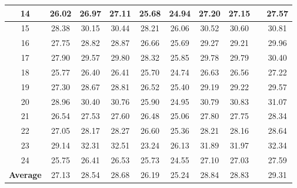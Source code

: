 \documentclass[10pt,twocolumn,letterpaper]{article}
\begin{document}
\begin{table}
\begin{center}
\begin{tabular}{|c||c|c|c|c|c|c|c|c|c|}
14 & 26.02 & 26.97 & 27.11 & 25.68 & 24.94 & 27.20 & 27.15 &  & 27.57
\\
\hline
15 & 28.38 & 30.15 & 30.44 & 28.21 & 26.06 & 30.52 & 30.60 &  & 30.81
\\
\hline
16 & 27.75 & 28.82 & 28.87 & 26.66 & 25.69 & 29.27 & 29.21 &  & 29.96
\\
\hline
17 & 27.90 & 29.57 & 29.80 & 28.32 & 25.85 & 29.78 & 29.79 &  & 30.40
\\
\hline
18 & 25.77 & 26.40 & 26.41 & 25.70 & 24.74 & 26.63 & 26.56 &  & 27.22
\\
\hline
19 & 27.30 & 28.67 & 28.81 & 26.52 & 25.40 & 29.19 & 29.22 &  & 29.57 
\\
\hline
20 & 28.96 & 30.40 & 30.76 & 25.90 & 24.95 & 30.79 & 30.83 &  & 31.07
\\
\hline
21 & 26.54 & 27.53 & 27.60 & 26.48 & 25.06 & 27.80 & 27.75 &  & 28.34
\\
\hline
22 & 27.05 & 28.17 & 28.27 & 26.60 & 25.36 & 28.21 & 28.16 &  & 28.64
\\
\hline
23 & 29.14 & 32.31 & 32.51 & 23.24 & 26.13 & 31.89 & 31.97 &  & 32.34
\\
\hline
24 & 25.75 & 26.41 & 26.53 & 25.73 & 24.55 & 27.10 & 27.03 &  & 27.59
\\
\hline
\textbf{Average} & 27.13 & 28.54 & 28.68 & 26.19 & 25.24 & 28.84 & 28.83 &  & 29.31
\\
\hline
\end{tabular}
\end{center}
\end{table}
\end{document}
